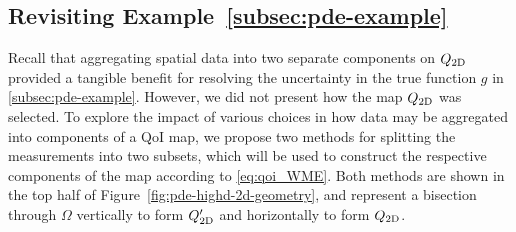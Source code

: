 \subsection{Revisiting Example~\ref{subsec:pde-example}}

Recall that aggregating spatial data into two separate components on $Q_\text{2D}$ provided a tangible benefit for resolving the uncertainty in the true function $g$ in \ref{subsec:pde-example}.
However, we did not present how the map $Q_\text{2D}$ was selected.
To explore the impact of various choices in how data may be aggregated into components of a QoI map, we propose two methods for splitting the measurements into two subsets, which will be used to construct the respective components of the map according to \eqref{eq:qoi_WME}.
Both methods are shown in the top half of Figure~\ref{fig:pde-highd-2d-geometry}, and represent a bisection through $\Omega$ vertically to form $Q_\text{2D}^\prime$ and horizontally to form $Q_\text{2D}$.

